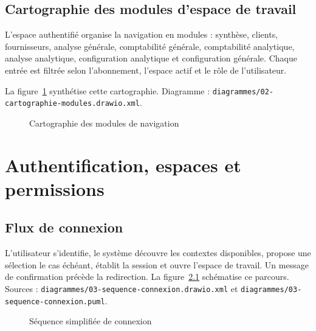 \documentclass[12pt,a4paper]{report}
\begin{document}
\section{Cartographie des modules d'espace de travail}

L'espace authentifié organise la navigation en modules : synthèse, clients, fournisseurs, analyse générale, comptabilité générale, comptabilité analytique, analyse analytique, configuration analytique et configuration générale. Chaque entrée est filtrée selon l'abonnement, l'espace actif et le rôle de l'utilisateur.

La figure~\ref{fig:modules} synthétise cette cartographie. Diagramme : \texttt{diagrammes/02-cartographie-modules.drawio.xml}.

\begin{figure}[htbp]
\centering
{}
\caption{Cartographie des modules de navigation}
\label{fig:modules}
\end{figure}

\chapter{Authentification, espaces et permissions}

\section{Flux de connexion}

L'utilisateur s'identifie, le système découvre les contextes disponibles, propose une sélection le cas échéant, établit la session et ouvre l'espace de travail. Un message de confirmation précède la redirection. La figure~\ref{fig:seq-login} schématise ce parcours. Sources : \texttt{diagrammes/03-sequence-connexion.drawio.xml} et \texttt{diagrammes/03-sequence-connexion.puml}.

\begin{figure}[htbp]
\centering
{}
\caption{Séquence simplifiée de connexion}
\label{fig:seq-login}
\end{figure}
\end{document}
